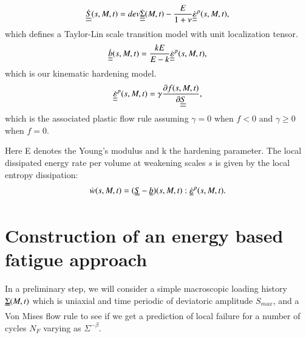 \documentclass[3p,times,number,review]{elsarticle}
\begin{document}
 
	\begin{equation}
    \dot{\uline{\uline{S}}}(s,M,t)=dev\dot{\uline{\uline{\Sigma}}}(M,t)-\dfrac{E}{1+\nu}\dot{\uline{\uline{\varepsilon}}}^p(s,M,t), 
	\end{equation}
     which defines a Taylor-Lin scale transition model with unit localization tensor\cite{Bosia201239}.
		\begin{equation}
		\dot{\uline{\uline{b}}}(s,M,t)=\dfrac{kE}{E-k} \dot{\uline{\uline{\varepsilon}}}^p(s,M,t), 
		\end{equation}
		which is our kinematic hardening model.
		\begin{equation}
		\dot{\uline{\uline{\varepsilon}}}^p(s,M,t)=\gamma\dfrac{\partial f(s,M,t)}{\partial \uline{\uline{S}}}, 
		\end{equation}
		which is the associated plastic flow rule assuming $\gamma=0$ when $f<0$ and  $\gamma\geqslant0$ when $f=0$.

Here E denotes the Young's modulus and k the hardening parameter. The local dissipated energy rate per volume at weakening scales $s$  is given by the local entropy dissipation:
\begin{equation}
	\dot{w}(s,M,t)=(\uuline{S}-\uuline{b})(s,M,t):\uuline{\dot{\varepsilon}}^p(s,M,t).
	\label{dissipated}
\end{equation}

\section{Construction of an energy based fatigue approach}

In a preliminary step, we will consider a simple macroscopic loading history $\uuline{\Sigma}(M, t)$ which is uniaxial
and time periodic of deviatoric amplitude $S_{max}$, and a Von Mises flow rule to see if we get a prediction of local failure for a number of cycles $N_F$ varying as $\Sigma^{-\beta}.$
\end{document}
